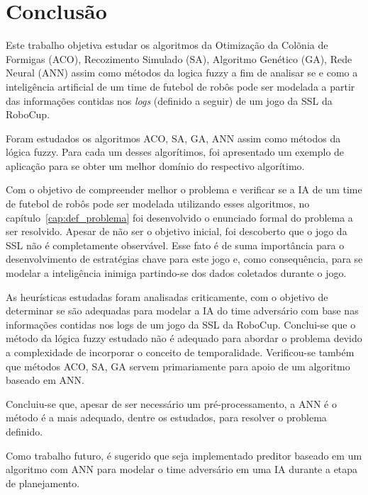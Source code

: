 \chapter{Conclusão}\label{cap:conclusao}

Este trabalho objetiva estudar os algoritmos da Otimização da Colõnia de
Formigas (ACO), Recozimento Simulado (SA), Algoritmo Genético (GA), Rede Neural
(ANN) assim como métodos da logica fuzzy a fim de analisar se e como a
inteligência artificial de um time de futebol de robôs pode ser modelada a
partir das informações contidas nos \textit{logs} (definido a seguir) de um jogo da SSL
da RoboCup.

Foram estudados os algoritmos ACO, SA, GA,
ANN assim como métodos da lógica fuzzy. Para cada um desses algorítimos, foi
apresentado
um exemplo de aplicação para se obter um melhor domínio do respectivo
algorítimo.

Com o objetivo de compreender melhor o problema e verificar se a IA de um time
de
futebol de robôs pode ser modelada utilizando esses algoritmos, no
capítulo~\ref{cap:def_problema} foi desenvolvido o enunciado formal do problema
a ser resolvido.
Apesar de não ser o objetivo inicial, foi descoberto que o jogo da SSL não é
completamente observável. Esse fato é de suma importância para o desenvolvimento
de estratégias chave para este jogo e, como consequência, para se modelar a
inteligência inimiga partindo-se dos dados coletados durante o jogo.

As heurísticas estudadas foram analisadas
criticamente, com o objetivo de determinar se são adequadas para modelar a IA
do time adversário com base nas informações contidas nos logs de um jogo da SSL
da RoboCup. Conclui-se que o método da lógica fuzzy estudado não é adequado para
abordar o problema devido a complexidade de incorporar o conceito de
temporalidade.
Verificou-se também que métodos ACO, SA, GA servem primariamente para apoio de
um algoritmo baseado em ANN\@.

Concluiu-se que, apesar de ser necessário um pré-processamento, a ANN é o
método é a mais adequado, dentre os estudados, para resolver o problema definido.

Como trabalho futuro, é sugerido que seja implementado preditor baseado em
um algoritmo com ANN para modelar o time adversário em uma IA durante a etapa de
planejamento.



